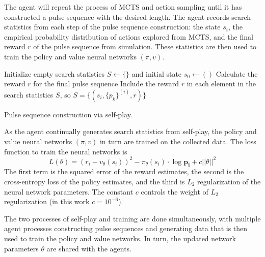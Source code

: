 The agent will repeat the process of MCTS and action sampling until it has constructed a pulse sequence with the desired length. The agent records search statistics from each step of the pulse sequence construction: the state $s_i$, the empirical probability distribution of actions explored from MCTS, and the final reward $r$ of the pulse sequence from simulation. These statistics are then used to train the policy and value neural networks $(\pi, v)$.


\begin{algorithm}[H]
\BlankLine
Initialize empty search statistics $S \leftarrow \{\}$
and initial state $s_0 \leftarrow ()$
\;
Calculate the reward $r$ for the final pulse sequence \;
Include the reward $r$ in each element in the search statistics $S$, so $S = \{ (s_i, \{p_k\}^{(i)}, r) \}$ \;
\caption{Pulse sequence construction via self-play. \label{al:make_sequence}}
\end{algorithm}

As the agent continually generates search statistics from self-play, the policy and value neural networks $(\pi, v)$ in turn are trained on the collected data. The loss function to train the neural networks is
\begin{equation}\label{eq:az_loss}
    L(\theta) = (r_i - v_\theta(s_i))^2 - \pi_\theta(s_i) \cdot \log \mathbf{p_i} + c ||\theta||^2
\end{equation}
The first term is the squared error of the reward estimates, the second is the cross-entropy loss of the policy estimates, and the third is $L_2$ regularization of the neural network parameters. The constant $c$ controls the weight of $L_2$ regularization (in this work $c = 10^{-6}$).

The two processes of self-play and training are done simultaneously, with multiple agent processes constructing pulse sequences and generating data that is then used to train the policy and value networks. In turn, the updated network parameters $\theta$ are shared with the agents.


